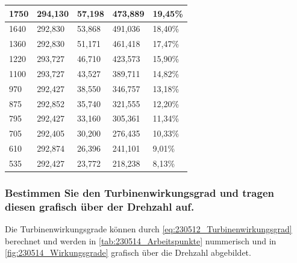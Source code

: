 \begin{table}[H]
\begin{tabular}{|l|l|l|l|l|}
      \rowcolor[HTML]{E2EFDA} 
      1750                                & 294,130      & 57,198        & 473,889     & \cellcolor[HTML]{DDEBF7}19,45\%      \\ \hline
      \rowcolor[HTML]{A9D08E} 
      1640                                & 292,830      & 53,868        & 491,036     & \cellcolor[HTML]{BDD7EE}18,40\%      \\ \hline
      \rowcolor[HTML]{E2EFDA} 
      1360                                & 292,830      & 51,171        & 461,418     & \cellcolor[HTML]{DDEBF7}17,47\%      \\ \hline
      \rowcolor[HTML]{A9D08E} 
      1220                                & 293,727      & 46,710        & 423,573     & \cellcolor[HTML]{BDD7EE}15,90\%      \\ \hline
      \rowcolor[HTML]{E2EFDA} 
      1100                                & 293,727      & 43,527        & 389,711     & \cellcolor[HTML]{DDEBF7}14,82\%      \\ \hline
      \rowcolor[HTML]{A9D08E} 
      970                                 & 292,427      & 38,550        & 346,757     & \cellcolor[HTML]{BDD7EE}13,18\%      \\ \hline
      \rowcolor[HTML]{E2EFDA} 
      875                                 & 292,852      & 35,740        & 321,555     & \cellcolor[HTML]{DDEBF7}12,20\%      \\ \hline
      \rowcolor[HTML]{A9D08E} 
      795                                 & 292,427      & 33,160        & 305,361     & \cellcolor[HTML]{BDD7EE}11,34\%      \\ \hline
      \rowcolor[HTML]{E2EFDA} 
      705                                 & 292,405      & 30,200        & 276,435     & \cellcolor[HTML]{DDEBF7}10,33\%      \\ \hline
      \rowcolor[HTML]{A9D08E} 
      610                                 & 292,874      & 26,396        & 241,101     & \cellcolor[HTML]{BDD7EE}9,01\%       \\ \hline
      \rowcolor[HTML]{E2EFDA} 
      535                                 & 292,427      & 23,772        & 218,238     & \cellcolor[HTML]{DDEBF7}8,13\%       \\ \hline
  \end{tabular}
  \label{tab:230514_Arbeitspunkte}
\end{table}

\subsubsection{Bestimmen Sie den Turbinenwirkungsgrad und tragen diesen grafisch über der Drehzahl auf.}
Die Turbinenwirkungsgrade können durch \autoref{eq:230512_Turbinenwirkungsgrad} berechnet und werden in \autoref{tab:230514_Arbeitspunkte} nummerisch und in \autoref{fig:230514_Wirkungsgrade} grafisch über die Drehzahl abgebildet. 

